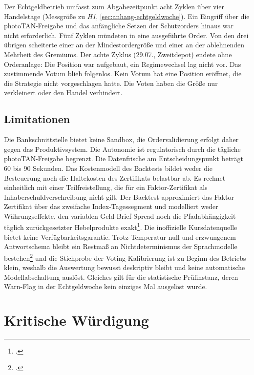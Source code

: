 Der Echtgeldbetrieb umfasst zum Abgabezeitpunkt acht Zyklen über vier Handelstage
(Messgröße zu \emph{H1}, \cref{sec:anhang-echtgeldwoche}). Ein Eingriff über die
photoTAN-Freigabe und das anfängliche Setzen der Schutzorders hinaus war nicht erforderlich. Fünf Zyklen mündeten in eine ausgeführte Order. Von den drei
übrigen scheiterte einer an der Mindestordergröße und einer an der ablehnenden Mehrheit des
Gremiums. Der achte Zyklus (29.07., Zweitdepot) endete ohne Orderanlage: Die Position war
aufgebaut, ein Regimewechsel lag nicht vor. Das zustimmende Votum blieb folgenlos. Kein Votum hat eine Position eröffnet, die die Strategie nicht vorgeschlagen
hatte. Die Voten haben die Größe nur verkleinert oder den Handel verhindert.

\subsection{Limitationen}
\label{sec:umsetzung-evaluation-limitationen}

Die Bankschnittstelle bietet keine Sandbox, die Ordervalidierung erfolgt daher gegen das
Produktivsystem. Die Autonomie ist regulatorisch durch die tägliche photoTAN-Freigabe begrenzt. Die Datenfrische
am Entscheidungspunkt beträgt 60 bis 90 Sekunden.
Das Kostenmodell des Backtests bildet weder die Besteuerung noch die Haltekosten des
Zertifikats belastbar ab. Es rechnet
einheitlich mit einer Teilfreistellung, die für ein Faktor-Zertifikat als
Inhaberschuldverschreibung nicht gilt. 
Der Backtest approximiert das
Faktor-Zertifikat über das zweifache Index-Tagessegment und modelliert weder
Währungseffekte, den variablen Geld-Brief-Spread noch die Pfadabhängigkeit täglich
zurückgesetzter Hebelprodukte
exakt\footcites[vgl.][S.~586--603]{avellaneda2010}[vgl.][S.~43--62]{cheng2009}. Die
inoffizielle Kursdatenquelle bietet keine Verfügbarkeitsgarantie. Trotz Temperatur null und
erzwungenem Antwortschema bleibt ein Restmaß an Nichtdeterminismus der Sprachmodelle
bestehen\footcite[vgl.][]{he2025nondeterminism} und die Stichprobe der Voting-Kalibrierung ist zu Beginn des Betriebs klein,
weshalb die Auswertung bewusst deskriptiv bleibt und keine automatische Modellabschaltung
auslöst. Gleiches gilt für die statistische Prüfinstanz, deren Warn-Flag in der
Echtgeldwoche kein einziges Mal ausgelöst wurde.

\section{Kritische Würdigung}
\label{sec:umsetzung-wuerdigung}

